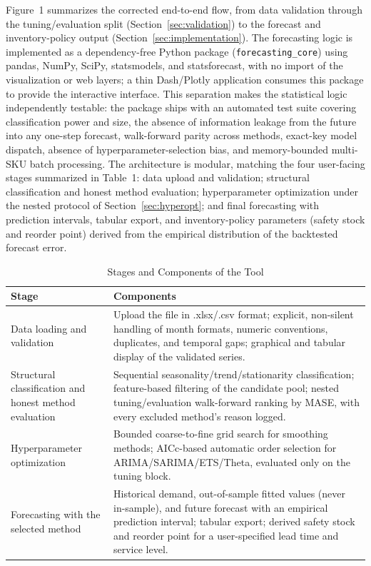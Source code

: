 \documentclass[forecasting,article,submit,pdftex,moreauthors]{Definitions/mdpi}
\begin{document}
Figure~1 summarizes the corrected end-to-end flow, from data validation through the tuning/evaluation split (Section~\ref{sec:validation}) to the forecast and inventory-policy output (Section~\ref{sec:implementation}). The forecasting logic is implemented as a dependency-free Python package (\texttt{forecasting\_core}) using pandas, NumPy, SciPy, statsmodels, and statsforecast, with no import of the visualization or web layers; a thin Dash/Plotly application consumes this package to provide the interactive interface. This separation makes the statistical logic independently testable: the package ships with an automated test suite covering classification power and size, the absence of information leakage from the future into any one-step forecast, walk-forward parity across methods, exact-key model dispatch, absence of hyperparameter-selection bias, and memory-bounded multi-SKU batch processing. The architecture is modular, matching the four user-facing stages summarized in Table~1: data upload and validation; structural classification and honest method evaluation; hyperparameter optimization under the nested protocol of Section~\ref{sec:hyperopt}; and final forecasting with prediction intervals, tabular export, and inventory-policy parameters (safety stock and reorder point) derived from the empirical distribution of the backtested forecast error.

\begin{table}[H]
\caption{Stages and Components of the Tool}
\centering
\begin{tabularx}{\textwidth}{lX}
\toprule
\textbf{Stage} & \textbf{Components} \\
\midrule
Data loading and validation & Upload the file in .xlsx/.csv format; explicit, non-silent handling of month formats, numeric conventions, duplicates, and temporal gaps; graphical and tabular display of the validated series. \\
Structural classification and honest method evaluation & Sequential seasonality/trend/stationarity classification; feature-based filtering of the candidate pool; nested tuning/evaluation walk-forward ranking by MASE, with every excluded method's reason logged. \\
Hyperparameter optimization & Bounded coarse-to-fine grid search for smoothing methods; AICc-based automatic order selection for ARIMA/SARIMA/ETS/Theta, evaluated only on the tuning block. \\
Forecasting with the selected method & Historical demand, out-of-sample fitted values (never in-sample), and future forecast with an empirical prediction interval; tabular export; derived safety stock and reorder point for a user-specified lead time and service level. \\
\bottomrule
\end{tabularx}
\end{table}
\end{document}
